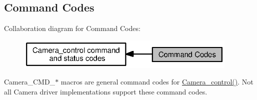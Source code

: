 \subsection{Command Codes}
\label{group___camera___c_m_d}
Collaboration diagram for Command Codes\+:
\nopagebreak
\begin{figure}[H]
\begin{center}
\leavevmode
\includegraphics[width=301pt]{group___camera___c_m_d}
\end{center}
\end{figure}
Camera\+\_\+\+C\+M\+D\+\_\+$\ast$ macros are general command codes for \hyperlink{_camera_8h_adfc7e9a60daa499220296a238a09b393}{Camera\+\_\+control()}. Not all Camera driver implementations support these command codes. 
